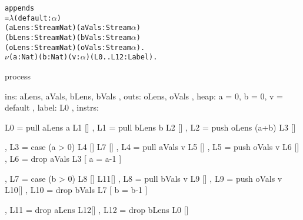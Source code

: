 \begin{alltt}
appends 
 =  \(\lambda\) (default : \(\alpha\))
      (aLens: Stream Nat) (aVals: Stream \(\alpha\))
      (bLens: Stream Nat) (bVals: Stream \(\alpha\))
      (oLens: Stream Nat) (oVals: Stream \(\alpha\)).
    \(\nu\) (a : Nat) (b : Nat) (v: \(\alpha\)) (L0..L12: Label).
\end{alltt}
\begin{code}
    process
    { ins:    { aLens, aVals, bLens, bVals }
    , outs:   { oLens, oVals }
    , heap:   { a = 0, b = 0, v = default }
    , label:  L0
    , instrs: { L0  = pull aLens  a    L1 []
              , L1  = pull bLens  b    L2 []
              , L2  = push oLens (a+b) L3 []

              , L3  = case (a > 0)     L4 []  L7 []
              , L4  = pull aVals v     L5 []
              , L5  = push oVals v     L6 []
              , L6  = drop aVals       L3 [ a = a-1 ]

              , L7  = case (b > 0)     L8 []  L11[]
              , L8  = pull bVals v     L9 []
              , L9  = push oVals v     L10[]
              , L10 = drop bVals       L7 [ b = b-1 ]

              , L11 = drop aLens        L12[]
              , L12 = drop bLens        L0 [] } }
\end{code}

